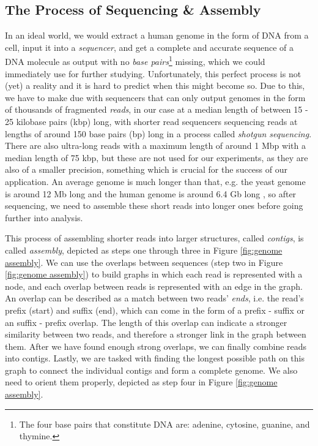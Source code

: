 \documentclass[times, utf8, diplomski, english]{fer_eng}
\begin{document}
\subsection{The Process of Sequencing \& Assembly}
\label{subsec:the process of sequencing and assembly}

In an ideal world, we would extract a human genome in the form of DNA from a cell, input it into a \textit{sequencer}, and get a complete and accurate sequence of a DNA molecule as output with no \textit{base pairs}\footnote{The four base pairs that constitute DNA are: adenine, cytosine, guanine, and thymine.} missing, which we could immediately use for further studying. Unfortunately, this perfect process is not (yet) a reality and it is hard to predict when this might become so. Due to this, we have to make due with sequencers that can only output genomes in the form of thousands of fragmented \textit{reads}, in our case at a median length of between 15 - 25 kilobase pairs (kbp) long, with shorter read sequencers sequencing reads at lengths of around 150 base pairs (bp) long in a process called \textit{shotgun sequencing}. There are also ultra-long reads with a maximum length of around 1 Mbp with a median length of 75 kbp, but these are not used for our experiments, as they are also of a smaller precision, something which is crucial for the success of our application. An average genome is much longer than that, e.g. the yeast genome is around 12 Mb long \cite{yeast} and the human genome is around 6.4 Gb long \cite{human}, so after sequencing, we need to assemble these short reads into longer ones before going further into analysis.

This process of assembling shorter reads into larger structures, called \textit{contigs}, is called \textit{assembly}, depicted as steps one through three in Figure \ref{fig:genome assembly}. We can use the overlaps between sequences (step two in Figure \ref{fig:genome assembly}) to build graphs in which each read is represented with a node, and each overlap between reads is represented with an edge in the graph. An overlap can be described as a match between two reads' \textit{ends}, i.e. the read's prefix (start) and suffix (end), which can come in the form of a prefix - suffix or an suffix - prefix overlap. The length of this overlap can indicate a stronger similarity between two reads, and therefore a stronger link in the graph between them. After we have found enough strong overlaps, we can finally combine reads into contigs. Lastly, we are tasked with finding the longest possible path on this graph to connect the individual contigs and form a complete genome. We also need to orient them properly, depicted as step four in Figure \ref{fig:genome assembly}.
\end{document}
